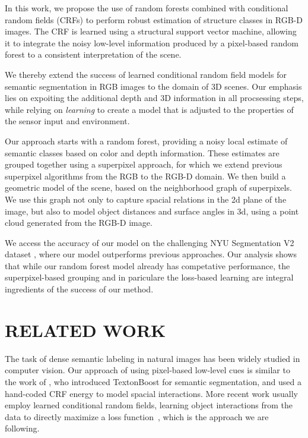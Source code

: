 \documentclass[a4paper, 10pt, conference]{ieeeconf}      %
\begin{document}
In this work, we propose the use of random forests combined with conditional
random fields (CRFs) to perform robust estimation of structure classes in RGB-D
images. The CRF is learned using a structural support vector machine,
allowing it to integrate the noisy low-level information produced by a pixel-based
random forest to a consistent interpretation of the scene.

We thereby extend the success of learned conditional random field models for
semantic segmentation in RGB images to the domain of 3D scenes.
Our emphasis lies on expoiting the additional depth and 3D information in all
procsessing steps, while relying on \emph{learning} to create a model that 
is adjusted to the properties of the sensor input and environment.

Our approach starts with a random forest, providing a noisy local estimate
of semantic classes based on color and depth information. These estimates
are grouped together using a superpixel approach, for which we extend previous
superpixel algorithms from the RGB to the RGB-D domain.
We then build a geometric model of the scene, based on the neighborhood graph
of superpixels.  We use this graph not only to capture spacial relations in the
2d plane of the image, but also to model object distances and surface angles in
3d, using a point cloud generated from the RGB-D image.

We access the accuracy of our model on the challenging NYU Segmentation V2
dataset \citep{SilbermanECCV12}, where our model outperforms previous
approaches.  Our analysis shows that while our random forest model
already has competative performance, the superpixel-based grouping and in
pariculare the loss-based learning are integral ingredients of the success of our method.

\section{RELATED WORK}
The task of dense semantic labeling in natural images has been widely studied
in computer vision.  Our approach of using pixel-based low-level cues is
similar to the work of \citet{shotton2006textonboost}, who introduced
TextonBoost for semantic segmentation, and used a hand-coded CRF energy to
model spacial interactions. More recent work usually employ learned conditional
random fields, learning object interactions from the
data to directly maximize a loss function~\citep{lucchi2013learning, krahenbuhl2012efficient},
which is the approach we are following.
\end{document}
